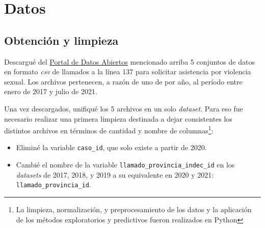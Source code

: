 \documentclass[10 pt]{article}
\begin{document}

\section{Datos}\label{datos}

\subsection{Obtención y limpieza}\label{limpieza}
Descargué del \href{http://datos.jus.gob.ar/}{Portal de Datos Abiertos} mencionado arriba 5 conjuntos de datos en formato \textit{csv} de llamados a la línea 137 para solicitar asistencia por violencia sexual. Los archivos pertenecen, a razón de uno de por año, al período entre enero de 2017 y julio de 2021. 

Una vez descargados, unifiqué los 5 archivos en un solo \textit{dataset}. Para eso fue necesario realizar una primera limpieza destinada a dejar consistentes los distintos archivos en términos de cantidad y nombre de columnas\footnote{La limpieza, normalización, y preprocesamiento de los datos y la aplicación de los métodos exploratorios y predictivos fueron realizados en Python}:

\begin{itemize}
    \item Eliminé la variable \texttt{caso\_id}, que solo existe a partir de 2020.
    \item Cambié el nombre de la variable \texttt{llamado\_provincia\_indec\_id} en los \textit{datasets} de 2017, 2018, y 2019 a su equivalente en 2020 y 2021: \texttt{llamado\_provincia\_id}.
\end{itemize}
\end{document}
